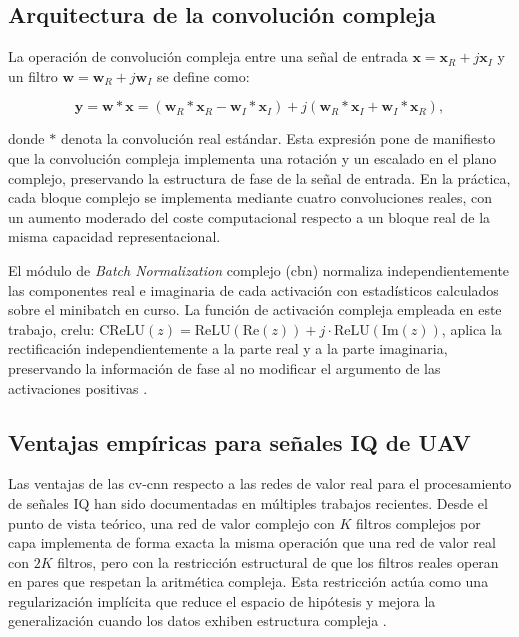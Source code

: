 \subsection{Arquitectura de la convolución compleja}
\label{subsec:convoluciones_complejas}

La operación de convolución compleja entre una señal de entrada $\mathbf{x} = \mathbf{x}_R + j\mathbf{x}_I$
y un filtro $\mathbf{w} = \mathbf{w}_R + j\mathbf{w}_I$ se define como:

\begin{equation}
 \mathbf{y} = \mathbf{w} * \mathbf{x} = (\mathbf{w}_R * \mathbf{x}_R - \mathbf{w}_I * \mathbf{x}_I) + j(\mathbf{w}_R * \mathbf{x}_I + \mathbf{w}_I * \mathbf{x}_R),
\end{equation}

donde $*$ denota la convolución real estándar. Esta expresión pone de manifiesto
que la convolución compleja implementa una rotación y un escalado en el plano
complejo, preservando la estructura de fase de la señal de entrada. En la práctica,
cada bloque complejo se implementa mediante cuatro convoluciones reales, con un
aumento moderado del coste computacional respecto a un bloque real de la misma
capacidad representacional.

El módulo de \textit{Batch Normalization} complejo (\gls{cbn}) normaliza
independientemente las componentes real e imaginaria de cada activación con
estadísticos calculados sobre el minibatch en curso. La función de activación
compleja empleada en este trabajo, \gls{crelu}: $\text{CReLU}(z) = \text{ReLU}(\text{Re}(z)) + j\cdot\text{ReLU}(\text{Im}(z))$,
aplica la rectificación independientemente a la parte real y a la parte imaginaria,
preservando la información de fase al no modificar el argumento de las activaciones
positivas \cite{trabelsi_deep_2018}.

\subsection{Ventajas empíricas para señales IQ de UAV}
\label{subsec:ventajas_cvcnn}

Las ventajas de las \gls{cv-cnn} respecto a las redes de valor real para el
procesamiento de señales IQ han sido documentadas en múltiples trabajos recientes.
Desde el punto de vista teórico, una red de valor complejo con $K$ filtros complejos
por capa implementa de forma exacta la misma operación que una red de valor real
con $2K$ filtros, pero con la restricción estructural de que los filtros reales
operan en pares que respetan la aritmética compleja. Esta restricción actúa como
una regularización implícita que reduce el espacio de hipótesis y mejora la
generalización cuando los datos exhiben estructura compleja \cite{trabelsi_deep_2018}.

